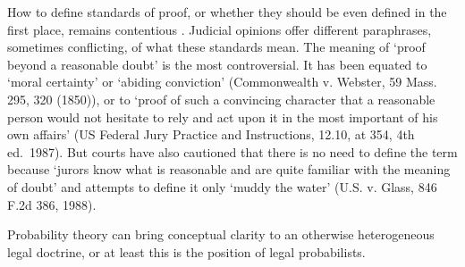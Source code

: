 \documentclass{article}
\begin{document}
%
%


How to define standards of proof, or whether they should be even defined in the first place, remains  contentious \citep{diamond90,newman1993, Horowitz1996,laudan2006truth,walen2015}. Judicial opinions offer different paraphrases, sometimes conflicting, of what these standards mean. The meaning of `proof beyond a reasonable doubt' is the most controversial. It has been equated to `moral certainty' or `abiding conviction' (Commonwealth v. Webster, 59 Mass. 295, 320 (1850)), or to `proof of such a convincing character that a reasonable person would not hesitate to rely and act upon it in the most important of his own affairs' (US Federal Jury Practice and Instructions, 12.10, at 354, 4th ed.\ 1987). But courts have also cautioned that there is no need to define the term because `jurors know what is reasonable and are quite familiar with the meaning of doubt' and attempts to define it only `muddy the water' (U.S. v. Glass, 846 F.2d 386, 1988).

Probability theory can bring conceptual clarity 
to an otherwise heterogeneous legal doctrine, 
or at least this is the position of legal probabilists.
\end{document}
